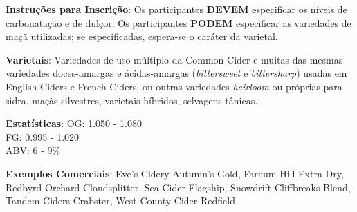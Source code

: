 \textbf{Instruções para Inscrição}: Os participantes \textbf{DEVEM} especificar os níveis de carbonatação e de dulçor. Os participantes \textbf{PODEM} especificar as variedades de maçã utilizadas; se especificadas, espera-se o caráter da varietal.

\textbf{Varietais}: Variedades de uso múltiplo da Common Cider e muitas das mesmas variedades doces-amargas e ácidas-amargas (\textit{bittersweet} e \textit{bittersharp}) usadas em English Ciders e French Ciders, ou outras variedades \textit{heirloom} ou próprias para sidra, maçãs silvestres, varietais híbridos, selvagens tânicas.

\textbf{Estatísticas}: OG: 1.050 - 1.080 \\
\phantom{ } \hspace{16.5mm} FG: 0.995 - 1.020 \\
\phantom{ } \hspace{16.5mm} ABV: 6 - 9\%

\textbf{Exemplos Comerciais}: Eve's Cidery Autumn's Gold, Farnum Hill Extra Dry, Redbyrd Orchard Cloudsplitter, Sea Cider Flagship, Snowdrift Cliffbreaks Blend, Tandem Ciders Crabster, West County Cider Redfield
